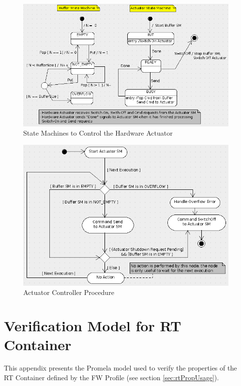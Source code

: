 \documentclass[a4paper,10pt]{article}
\let\stdsection\section
\renewcommand\section{\newpage\stdsection}
\begin{document}
\newpage
\begin{figure}[ht]
 \centering
 \includegraphics[scale=0.45,keepaspectratio=true]{../images/FV_Actuator.png}
 \caption{State Machines to Control the Hardware Actuator}
 \label{fig:FV_Actuator}
\end{figure}
\begin{figure}[ht]
 \centering
 \includegraphics[scale=0.45,keepaspectratio=true]{../images/FV_ActuatorController.png}
 \caption{Actuator Controller Procedure}
 \label{fig:FV_ActuatorController2}
\end{figure}



\appendix
\section{Verification Model for RT Container}\label{sec:verificationModelForRtContainers}
This appendix presents the Promela model used to verify the properties of the RT Container defined by the FW Profile (see section \ref{sec:rtPropUsage}).  
\end{document}
